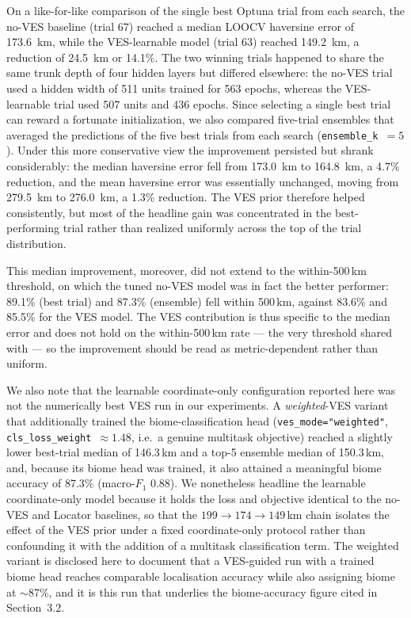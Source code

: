 \documentclass[twocolumn,10pt]{article}
\begin{document}
On a like-for-like comparison of the single best Optuna trial from each search, the no-VES baseline
(trial 67) reached a median LOOCV haversine error of 173.6~km, while the VES-learnable model (trial
63) reached 149.2~km, a reduction of 24.5~km or 14.1\%. The two winning trials happened to share the
same trunk depth of four hidden layers but differed elsewhere: the no-VES trial used a hidden width
of 511 units trained for 563 epochs, whereas the VES-learnable trial used 507 units and 436 epochs.
Since selecting a single best trial can reward a fortunate initialization, we also compared
five-trial ensembles that averaged the predictions of the five best trials from each search
(\texttt{ensemble\_k}~$=5$). Under this more conservative view the improvement persisted but shrank
considerably: the median haversine error fell from 173.0~km to 164.8~km, a 4.7\% reduction, and the
mean haversine error was essentially unchanged, moving from 279.5~km to 276.0~km, a 1.3\% reduction.
The VES prior therefore helped consistently, but most of the headline gain was concentrated in the
best-performing trial rather than realized uniformly across the top of the trial distribution.

This median improvement, moreover, did not extend to the within-500\,km threshold, on which the
tuned no-VES model was in fact the better performer: 89.1\% (best trial) and 87.3\% (ensemble) fell
within 500\,km, against 83.6\% and 85.5\% for the VES model. The VES contribution is thus specific
to the median error and does not hold on the within-500\,km rate --- the very threshold shared with
\citet{lazzari2025development} --- so the improvement should be read as metric-dependent rather than
uniform.

We also note that the learnable coordinate-only configuration reported here was not the numerically
best VES run in our experiments. A \emph{weighted}-VES variant that additionally trained the
biome-classification head (\texttt{ves\_mode="weighted"}, \texttt{cls\_loss\_weight}~$\approx1.48$,
i.e.\ a genuine multitask objective) reached a slightly lower best-trial median of 146.3\,km and a
top-5 ensemble median of 150.3\,km, and, because its biome head was trained, it also attained a
meaningful biome accuracy of 87.3\% (macro-$F_1$ 0.88). We nonetheless headline the learnable
coordinate-only model because it holds the loss and objective identical to the no-VES and Locator
baselines, so that the $199 \rightarrow 174 \rightarrow 149$\,km chain isolates the effect of the
VES prior under a fixed coordinate-only protocol rather than confounding it with the addition of a
multitask classification term. The weighted variant is disclosed here to document that a VES-guided
run with a trained biome head reaches comparable localisation accuracy while also assigning biome at
$\sim$87\%, and it is this run that underlies the biome-accuracy figure cited in Section~3.2.
\end{document}
